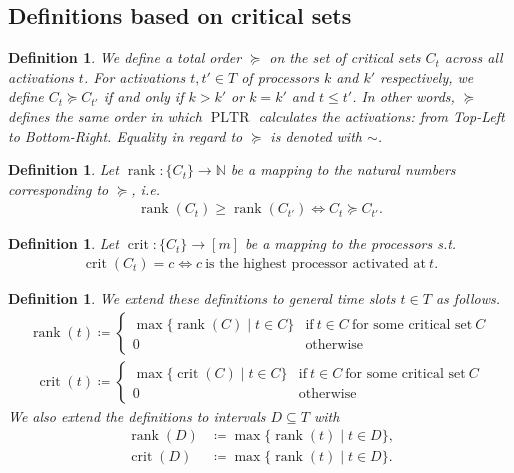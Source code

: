 \documentclass[a4paper]{article}
\DeclareMathOperator{\PLTR}{PLTR}
\DeclareMathOperator{\rank}{rank}
\DeclareMathOperator{\crit}{crit}
\newtheorem{definition}[theorem]{Definition}
\begin{document}
\subsection{Definitions based on critical sets}
\begin{definition}
  We define a total order $\succeq$ on the set of critical sets $C_t$ across all activations $t$.
  For activations $t, t' \in T$ of processors $k$ and $k'$ respectively, we define $C_t \succeq C_{t'}$ if and only if $k > k'$ or $k = k'$ and $t \leq t'$.
  In other words, $\succeq$ defines the same order in which $\PLTR$ calculates the activations: from Top-Left to Bottom-Right.
  Equality in regard to $\succeq$ is denoted with $\sim$.
\end{definition}
\begin{definition}
  Let $\rank: \{C_t\} \rightarrow \mathbb{N}$ be a mapping to the natural numbers corresponding to $\succeq$, i.e.
  \begin{align}
    \rank(C_t) \geq \rank(C_{t'})
    \Leftrightarrow
    C_t \succeq C_{t'} \text{.}
  \end{align}
\end{definition}
\begin{definition}
  Let $\crit: \{C_t\} \rightarrow [m]$ be a mapping to the processors s.t.
  \begin{align}
    \crit(C_t) = c
    \Leftrightarrow
    c~\text{is the highest processor activated at}~t \text{.}
  \end{align}
\end{definition}
\begin{definition}
  We extend these definitions to general time slots $t \in T$ as follows.
  \begin{align}
    \rank(t) \coloneqq
    \begin{cases}
      \max \{\rank(C) \mid t \in C \}
      & \text{if}~t \in C~\text{for some critical set}~C
      \\0
      & \text{otherwise}
    \end{cases}
  \end{align}
  \begin{align}
    \crit(t) \coloneqq
    \begin{cases}
      \max \{\crit(C) \mid t \in C \}
      & \text{if}~t \in C~\text{for some critical set}~C
      \\0
      & \text{otherwise}
    \end{cases}
  \end{align}
  We also extend the definitions to intervals $D \subseteq T$ with
  \begin{align}
    \rank(D) &\coloneqq \max \{ \rank(t) \mid t \in D \} \text{,}
    \\ \crit(D) &\coloneqq \max \{ \rank(t) \mid t \in D \} \text{.}
  \end{align}
\end{definition}
\end{document}
